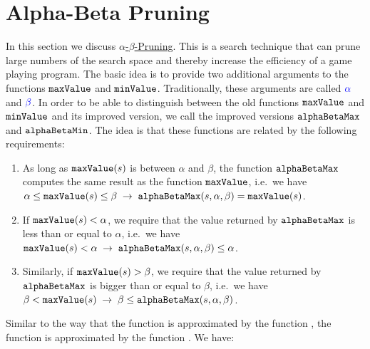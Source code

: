 \section{Alpha-Beta Pruning}
In this section we discuss \href{https://en.wikipedia.org/wiki/Alpha-beta_pruning}{$\alpha$-$\beta$-Pruning}.
This is a search technique that can prune large numbers of the search space and thereby increase the efficiency
of a game playing program.  The basic idea is to provide two additional arguments to the functions
$\texttt{maxValue}$ and $\texttt{minValue}$.  Traditionally, these arguments are called ${\color{blue}\alpha}$ and ${\color{blue}\beta}$.  In order to be able to
distinguish between the old functions $\texttt{maxValue}$ and  $\texttt{minValue}$ and its
improved version, we call the improved versions  
$\texttt{alphaBetaMax}$ and $\texttt{alphaBetaMin}$.  The idea is that these functions are
related by the following requirements: 
\begin{enumerate}
\item As long as $\texttt{maxValue}(s)$ is between $\alpha$ and $\beta$, the function
      $\texttt{alphaBetaMax}$ computes the same result as the function $\texttt{maxValue}$,
      i.e.~we have
      \\[0.2cm]
      \hspace*{0.3cm}
      $\alpha \leq \texttt{maxValue}(s) \leq \beta \;\rightarrow\;
         \texttt{alphaBetaMax}(s, \alpha, \beta) = \texttt{maxValue}(s)
      $.
\item If $\texttt{maxValue}(s) < \alpha$, we require that the value returned by
      $\texttt{alphaBetaMax}$ is less than or equal to $\alpha$, i.e.~we have 
      \\[0.2cm]
      \hspace*{0.3cm}
      $\texttt{maxValue}(s) < \alpha \;\rightarrow\; \texttt{alphaBetaMax}(s, \alpha, \beta) \leq \alpha$.
\item Similarly, if $\texttt{maxValue}(s) > \beta$, we require that the value
      returned by $\texttt{alphaBetaMax}$ is bigger than or equal to $\beta$, i.e.~we have 
      \\[0.2cm]
      \hspace*{0.3cm}
      $\beta < \texttt{maxValue}(s) \;\rightarrow\; \beta \leq \texttt{alphaBetaMax}(s, \alpha, \beta)$.
\end{enumerate}
Similar to the way that the function  is approximated by the function ,
the function  is approximated by the function .  We have: 
